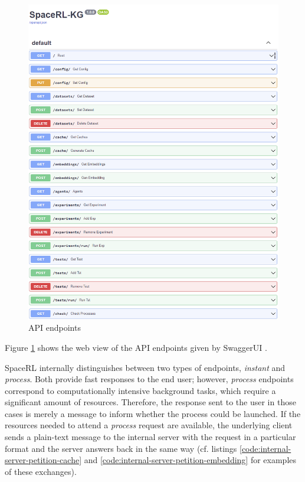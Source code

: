 \begin{figure}[!h]
    \centering
    \includegraphics[width=.8\textwidth]{fig/framework/API/api_docs.png}
    \caption{API endpoints}
    \label{fig:endpoints}
\end{figure}

Figure \ref{fig:endpoints} shows the web view of the API endpoints given by SwaggerUI \cite{Swagger}. 

SpaceRL internally distinguishes  between two types of endpoints, \emph{instant} and \emph{process}. Both provide fast responses to the end user; however, \emph{process} endpoints correspond to computationally intensive background tasks, which require a significant amount of resources. Therefore, the response sent to the user in those cases is merely a message to inform whether the process could be launched. If the resources needed to attend a \emph{process} request are available, the  underlying client sends a plain-text message to the internal server with the request in a particular format and the server answers back in the same way (cf. listings \ref{code:internal-server-petition-cache} and \ref{code:internal-server-petition-embedding} for examples of these exchanges). 



